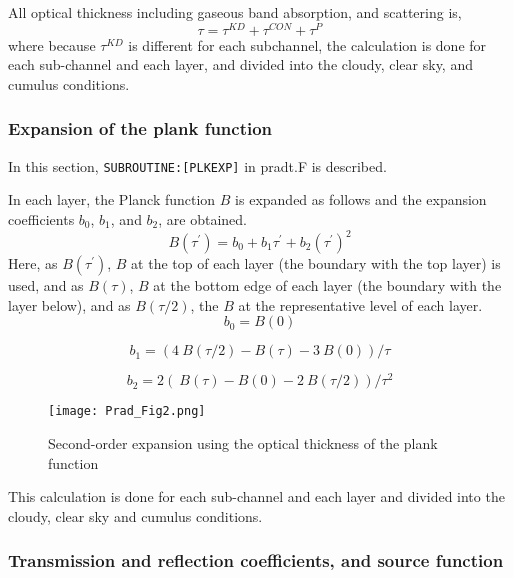 All optical thickness including gaseous band absorption, and scattering
is, \begin{equation}
\tau=\tau^{K D}+\tau^{C O N}+\tau^{P}
\end{equation} where because \(\tau^{K D}\) is different for each subchannel, the
calculation is done for each sub-channel and each layer, and divided
into the cloudy, clear sky, and cumulus conditions.

\hypertarget{expansion-of-the-plank-function}{%
\subsubsection{Expansion of the plank
function}\label{expansion-of-the-plank-function}}

In this section, \texttt{SUBROUTINE:{[}PLKEXP{]}} in pradt.F is
described.

In each layer, the Planck function \(B\) is expanded as follows and the
expansion coefficients \(b_0\), \(b_1\), and \(b_2\), are obtained. \begin{equation}
{B}\left(\tau^{\prime}\right)=b_{0}+b_{1} \tau^{\prime}+b_{2}\left(\tau^{\prime}\right)^{2}
\end{equation} Here, as \({B}\left(\tau^{\prime}\right)\), \(B\) at the top of each
layer (the boundary with the top layer) is used, and as \({B}(\tau)\),
\(B\) at the bottom edge of each layer (the boundary with the layer
below), and as \({B}(\tau / 2)\), the \(B\) at the representative level
of each layer. \begin{equation}
b_{0}=B(0)
\end{equation}

\begin{equation}
b_{1}=(4{~B}(\tau / 2)-{B}(\tau)-3{~B}(0)) / \tau
\end{equation}

\begin{equation}
b_{2}=2({~B}(\tau)-{B}(0)-2{~B}(\tau / 2)) / \tau^{2}
\end{equation}

\begin{figure}
\centering
\texttt{[image: Prad\_Fig2.png]}
\caption{Second-order expansion using the optical thickness of the plank
function}
\end{figure}

This calculation is done for each sub-channel and each layer and divided
into the cloudy, clear sky and cumulus conditions.

\hypertarget{transmission-and-reflection-coefficients-and-source-function}{%
\subsubsection{Transmission and reflection coefficients, and source
function}\label{transmission-and-reflection-coefficients-and-source-function}}

